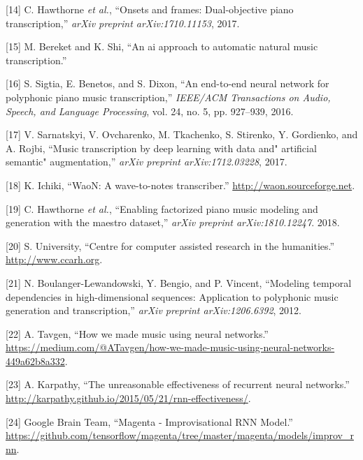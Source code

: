 \documentclass[12pt,]{article}
\begin{document}
\leavevmode\hypertarget{ref-hawthorne2017onsets}{}%
{[}14{]} C. Hawthorne \emph{et al.}, ``Onsets and frames: Dual-objective
piano transcription,'' \emph{arXiv preprint arXiv:1710.11153}, 2017.

\leavevmode\hypertarget{ref-bereketai}{}%
{[}15{]} M. Bereket and K. Shi, ``An ai approach to automatic natural
music transcription.''

\leavevmode\hypertarget{ref-sigtia2016end}{}%
{[}16{]} S. Sigtia, E. Benetos, and S. Dixon, ``An end-to-end neural
network for polyphonic piano music transcription,'' \emph{IEEE/ACM
Transactions on Audio, Speech, and Language Processing}, vol. 24, no. 5,
pp. 927--939, 2016.

\leavevmode\hypertarget{ref-sarnatskyi2017music}{}%
{[}17{]} V. Sarnatskyi, V. Ovcharenko, M. Tkachenko, S. Stirenko, Y.
Gordienko, and A. Rojbi, ``Music transcription by deep learning with
data and" artificial semantic" augmentation,'' \emph{arXiv preprint
arXiv:1712.03228}, 2017.

\leavevmode\hypertarget{ref-waon}{}%
{[}18{]} K. Ichiki, ``WaoN: A wave-to-notes transcriber.''
\url{http://waon.sourceforge.net}.

\leavevmode\hypertarget{ref-maestro2018}{}%
{[}19{]} C. Hawthorne \emph{et al.}, ``Enabling factorized piano music
modeling and generation with the maestro dataset,'' \emph{arXiv preprint
arXiv:1810.12247}. 2018.

\leavevmode\hypertarget{ref-ccarh}{}%
{[}20{]} S. University, ``Centre for computer assisted research in the
humanities.'' \\
\url{http://www.ccarh.org}.

\leavevmode\hypertarget{ref-boulanger2012modeling}{}%
{[}21{]} N. Boulanger-Lewandowski, Y. Bengio, and P. Vincent, ``Modeling
temporal dependencies in high-dimensional sequences: Application to
polyphonic music generation and transcription,'' \emph{arXiv preprint
arXiv:1206.6392}, 2012.

\leavevmode\hypertarget{ref-alextavgen}{}%
{[}22{]} A. Tavgen, ``How we made music using neural networks.'' \\
\url{https://medium.com/@ATavgen/how-we-made-music-using-neural-networks-449a62b8a332}.

\leavevmode\hypertarget{ref-karpathy}{}%
{[}23{]} A. Karpathy, ``The unreasonable effectiveness of recurrent
neural networks.'' \\
\url{http://karpathy.github.io/2015/05/21/rnn-effectiveness/}.

\leavevmode\hypertarget{ref-magentaimprov}{}%
{[}24{]} \relax Google Brain Team, ``Magenta - Improvisational RNN
Model.'' \\
\url{https://github.com/tensorflow/magenta/tree/master/magenta/models/improv_rnn}.
\end{document}
